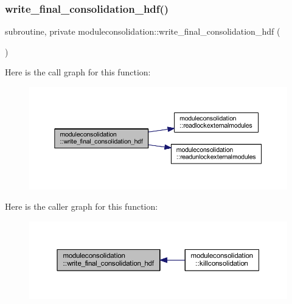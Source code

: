 \subsubsection{\texorpdfstring{write\+\_\+final\+\_\+consolidation\+\_\+hdf()}{write\_final\_consolidation\_hdf()}}
{\footnotesize\ttfamily subroutine, private moduleconsolidation\+::write\+\_\+final\+\_\+consolidation\+\_\+hdf (\begin{DoxyParamCaption}{ }\end{DoxyParamCaption})\hspace{0.3cm}{\ttfamily [private]}}

Here is the call graph for this function\+:\nopagebreak
\begin{figure}[H]
\begin{center}
\leavevmode
\includegraphics[width=350pt]{namespacemoduleconsolidation_abab71f3745fefbe658e80b47d85e3662_cgraph}
\end{center}
\end{figure}
Here is the caller graph for this function\+:\nopagebreak
\begin{figure}[H]
\begin{center}
\leavevmode
\includegraphics[width=350pt]{namespacemoduleconsolidation_abab71f3745fefbe658e80b47d85e3662_icgraph}
\end{center}
\end{figure}
\mbox{\label{namespacemoduleconsolidation_ae7ca7200e9ac29d962cff15374878a4e}} 
